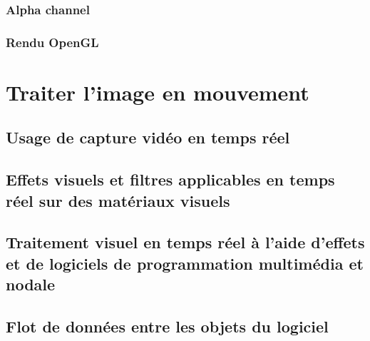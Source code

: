 \documentclass[
]{book}
\begin{document}
\hypertarget{alpha-channel}{%
\subsection{Alpha channel}\label{alpha-channel}}

\hypertarget{rendu-opengl}{%
\subsection{Rendu OpenGL}\label{rendu-opengl}}

\hypertarget{traiter}{%
\chapter{Traiter l'image en mouvement}\label{traiter}}

\hypertarget{usage-de-capture-viduxe9o-en-temps-ruxe9el}{%
\section{Usage de capture vidéo en temps réel}\label{usage-de-capture-viduxe9o-en-temps-ruxe9el}}

\hypertarget{effets-visuels-et-filtres-applicables-en-temps-ruxe9el-sur-des-matuxe9riaux-visuels}{%
\section{Effets visuels et filtres applicables en temps réel sur des matériaux visuels}\label{effets-visuels-et-filtres-applicables-en-temps-ruxe9el-sur-des-matuxe9riaux-visuels}}

\hypertarget{traitement-visuel-en-temps-ruxe9el-uxe0-laide-deffets-et-de-logiciels-de-programmation-multimuxe9dia-et-nodale}{%
\section{Traitement visuel en temps réel à l'aide d'effets et de logiciels de programmation multimédia et nodale}\label{traitement-visuel-en-temps-ruxe9el-uxe0-laide-deffets-et-de-logiciels-de-programmation-multimuxe9dia-et-nodale}}

\hypertarget{flot-de-donnuxe9es-entre-les-objets-du-logiciel}{%
\section{Flot de données entre les objets du logiciel}\label{flot-de-donnuxe9es-entre-les-objets-du-logiciel}}
\end{document}

